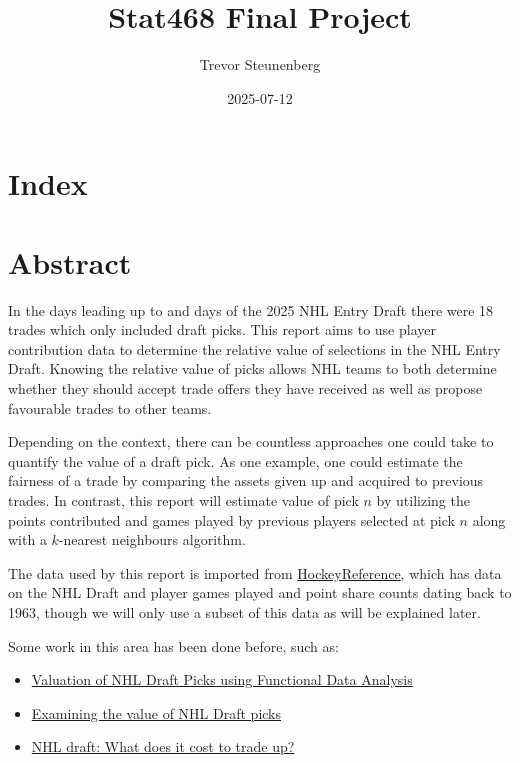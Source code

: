 \documentclass[
  letterpaper,
  DIV=11,
  numbers=noendperiod]{scrreprt}
\title{Stat468 Final Project}
\author{Trevor Steunenberg}
\date{2025-07-12}
\renewcommand*\contentsname{Table of contents}
\newcommand\contentsname{Table of contents}
\begin{document}
\maketitle

\renewcommand*\contentsname{Table of contents}
{
\hypersetup{linkcolor=}
\setcounter{tocdepth}{2}
\tableofcontents
}

\chapter{Index}\label{index}


\chapter{Abstract}\label{abstract}

In the days leading up to and days of the 2025 NHL Entry Draft there
were 18 trades which only included draft picks. This report aims to use
player contribution data to determine the relative value of selections
in the NHL Entry Draft. Knowing the relative value of picks allows NHL
teams to both determine whether they should accept trade offers they
have received as well as propose favourable trades to other teams.

Depending on the context, there can be countless approaches one could
take to quantify the value of a draft pick. As one example, one could
estimate the fairness of a trade by comparing the assets given up and
acquired to previous trades. In contrast, this report will estimate
value of pick \(n\) by utilizing the points contributed and games played
by previous players selected at pick \(n\) along with a \(k\)-nearest
neighbours algorithm.

The data used by this report is imported from
\href{https://www.hockey-reference.com/draft/}{HockeyReference}, which
has data on the NHL Draft and player games played and point share counts
dating back to 1963, though we will only use a subset of this data as
will be explained later.

Some work in this area has been done before, such as:

\begin{itemize}
\item
  \href{https://summit.sfu.ca/_flysystem/fedora/2023-02/etd22223.pdf}{Valuation
  of NHL Draft Picks using Functional Data Analysis}
\item
  \href{https://soundofhockey.com/2022/06/06/examining-the-value-of-nhl-draft-picks/amp/}{Examining
  the value of NHL Draft picks}
\item
  \href{https://www.broadstreethockey.com/post/nhl-draft-pick-value-trading-up/}{NHL
  draft: What does it cost to trade up?}
\end{itemize}
\end{document}
